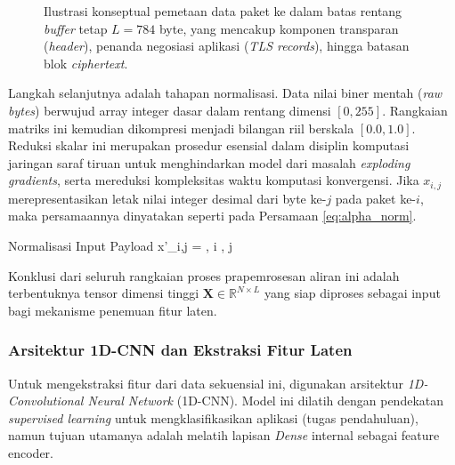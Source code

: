 \begin{figure}[h!]
    
    \caption{Ilustrasi konseptual pemetaan data paket ke dalam batas rentang \textit{buffer} tetap $L=784$ byte, yang mencakup komponen transparan (\textit{header}), penanda negosiasi aplikasi (\textit{TLS records}), hingga batasan blok \textit{ciphertext}.}
    \label{fig:anatomy_784_bytes}
\end{figure}

Langkah selanjutnya adalah tahapan normalisasi. Data nilai biner mentah (\textit{raw bytes}) berwujud array integer dasar dalam rentang dimensi $[0, 255]$. Rangkaian matriks ini kemudian dikompresi menjadi bilangan riil berskala $[0.0, 1.0]$. Reduksi skalar ini merupakan prosedur esensial dalam disiplin komputasi jaringan saraf tiruan untuk menghindarkan model dari masalah \textit{exploding gradients}, serta mereduksi kompleksitas waktu komputasi konvergensi. Jika $x_{i,j}$ merepresentasikan letak nilai integer desimal dari byte ke-$j$ pada paket ke-$i$, maka persamaannya dinyatakan seperti pada Persamaan \ref{eq:alpha_norm}.

\begin{myequation}{Normalisasi Input Payload}
    \label{eq:alpha_norm}
    x'_{i,j} = , \quad \forall i \in [1, N], \forall j \in [1, L]
\end{myequation}

Konklusi dari seluruh rangkaian proses prapemrosesan aliran ini adalah terbentuknya tensor dimensi tinggi $\mathbf{X} \in \mathbb{R}^{N \times L}$ yang siap diproses sebagai input bagi mekanisme penemuan fitur laten.

\subsubsection{Arsitektur 1D-CNN dan Ekstraksi Fitur Laten}
Untuk mengekstraksi fitur dari data sekuensial ini, digunakan arsitektur \textit{1D-Convolutional Neural Network} (1D-CNN). Model ini dilatih dengan pendekatan \textit{supervised learning} untuk mengklasifikasikan aplikasi (tugas pendahuluan), namun tujuan utamanya adalah melatih lapisan \textit{Dense} internal sebagai feature encoder.

